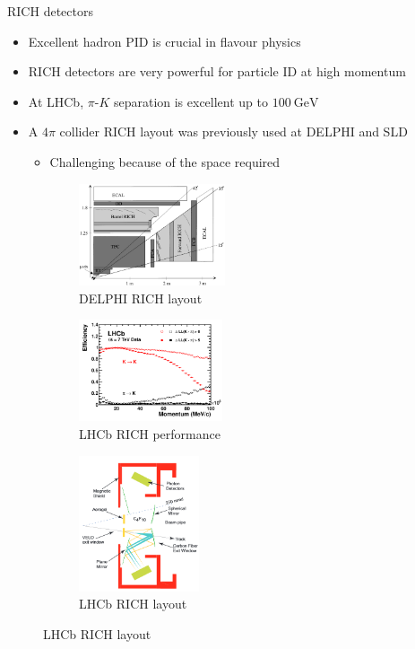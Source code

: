\documentclass{beamer}
\begin{document}
\begin{frame}{RICH detectors}
  \begin{itemize}
    \setlength\itemsep{0.5em}
    \item{Excellent hadron PID is crucial in flavour physics}
    \item{RICH detectors are very powerful for particle ID at high momentum}
    \item{At LHCb, $\pi$-$K$ separation is excellent up to $\SI{100}{\giga\eV}$}
    \item{A $4\pi$ collider RICH layout was previously used at DELPHI and SLD}
    \begin{itemize}
      \item{Challenging because of the space required}
    \end{itemize}
  \end{itemize}
  \begin{figure}
    \centering
    \vspace{-0.2cm}
    \begin{subfigure}{0.35\textwidth}
      \includegraphics[height = 3.0cm]{Plots/DELPHI_RICH.jpg}
      \caption{DELPHI RICH layout}
    \end{subfigure}%
    \begin{subfigure}{0.35\textwidth}
      \includegraphics[height = 3.0cm]{Plots/KandPi_2_K.pdf}
      \caption{LHCb RICH performance}
    \end{subfigure}%
    \begin{subfigure}{0.3\textwidth}
      \vspace{-1cm}
      \includegraphics[height = 4.0cm]{Plots/LHCb_RICH.png}
      \caption{LHCb RICH layout}
    \end{subfigure}
  \end{figure}
\end{frame}
\end{document}
